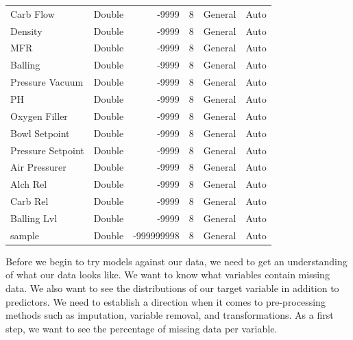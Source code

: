 \documentclass[]{report}
\newenvironment{Shaded}{\begin{snugshade}}{\end{snugshade}}
\newcommand{\CommentTok}[1]{\textcolor[rgb]{0.56,0.35,0.01}{\textit{#1}}}
\newcommand{\ControlFlowTok}[1]{\textcolor[rgb]{0.13,0.29,0.53}{\textbf{#1}}}
\newcommand{\DataTypeTok}[1]{\textcolor[rgb]{0.13,0.29,0.53}{#1}}
\newcommand{\DecValTok}[1]{\textcolor[rgb]{0.00,0.00,0.81}{#1}}
\newcommand{\KeywordTok}[1]{\textcolor[rgb]{0.13,0.29,0.53}{\textbf{#1}}}
\newcommand{\NormalTok}[1]{#1}
\newcommand{\OperatorTok}[1]{\textcolor[rgb]{0.81,0.36,0.00}{\textbf{#1}}}
\newcommand{\StringTok}[1]{\textcolor[rgb]{0.31,0.60,0.02}{#1}}
\begin{document}
\begin{table}[H]
\begin{tabular}[t]{llrrll}
Carb Flow & Double & -9999 & 8 & General & Auto\\
\rowcolor{gray!6}  Density & Double & -9999 & 8 & General & Auto\\
MFR & Double & -9999 & 8 & General & Auto\\
\rowcolor{gray!6}  Balling & Double & -9999 & 8 & General & Auto\\
\addlinespace
Pressure Vacuum & Double & -9999 & 8 & General & Auto\\
\rowcolor{gray!6}  PH & Double & -9999 & 8 & General & Auto\\
Oxygen Filler & Double & -9999 & 8 & General & Auto\\
\rowcolor{gray!6}  Bowl Setpoint & Double & -9999 & 8 & General & Auto\\
Pressure Setpoint & Double & -9999 & 8 & General & Auto\\
\addlinespace
\rowcolor{gray!6}  Air Pressurer & Double & -9999 & 8 & General & Auto\\
Alch Rel & Double & -9999 & 8 & General & Auto\\
\rowcolor{gray!6}  Carb Rel & Double & -9999 & 8 & General & Auto\\
Balling Lvl & Double & -9999 & 8 & General & Auto\\
\rowcolor{gray!6}  sample & Double & -999999998 & 8 & General & Auto\\
\bottomrule
\end{tabular}
\end{table}

\newpage

Before we begin to try models against our data, we need to get an
understanding of what our data looks like. We want to know what
variables contain missing data. We also want to see the distributions of
our target variable in addition to predictors. We need to establish a
direction when it comes to pre-processing methods such as imputation,
variable removal, and transformations. As a first step, we want to see
the percentage of missing data per variable.

\begin{Shaded}
\end{Shaded}
\end{document}
